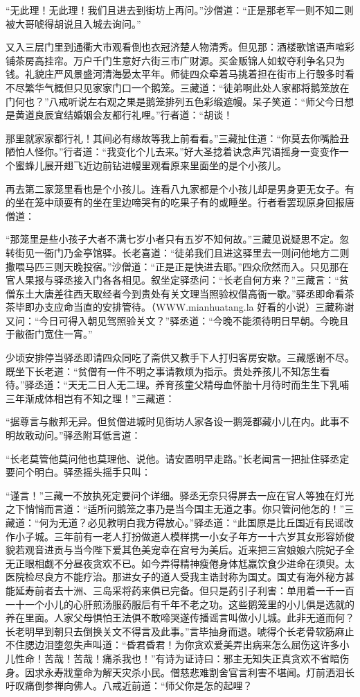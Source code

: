 \documentclass[12pt,UTF8]{ctexbook}
\begin{document}
{	“无此理！无此理！我们且进去到街坊上再问。”沙僧道：“正是那老军一则不知二则被大哥唬得胡说且入城去询问。”
	
	又入三层门里到通衢大市观看倒也衣冠济楚人物清秀。但见那：酒楼歌馆语声喧彩铺茶房高挂帘。万户千门生意好六街三市广财源。买金贩锦人如蚁夺利争名只为钱。礼貌庄严风景盛河清海晏太平年。师徒四众牵着马挑着担在街市上行彀多时看不尽繁华气概但只见家家门口一个鹅笼。三藏道：“徒弟啊此处人家都将鹅笼放在门何也？”八戒听说左右观之果是鹅笼排列五色彩缎遮幔。呆子笑道：“师父今日想是黄道良辰宜结婚姻会友都行礼哩。”行者道：“胡谈！
	
	那里就家家都行礼！其间必有缘故等我上前看看。”三藏扯住道：“你莫去你嘴脸丑陋怕人怪你。”行者道：“我变化个儿去来。”好大圣捻着诀念声咒语摇身一变变作一个蜜蜂儿展开翅飞近边前钻进幔里观看原来里面坐的是个小孩儿。
	
	再去第二家笼里看也是个小孩儿。连看八九家都是个小孩儿却是男身更无女子。有的坐在笼中顽耍有的坐在里边啼哭有的吃果子有的或睡坐。行者看罢现原身回报唐僧道：
	
	“那笼里是些小孩子大者不满七岁小者只有五岁不知何故。”三藏见说疑思不定。忽转街见一衙门乃金亭馆驿。长老喜道：“徒弟我们且进这驿里去一则问他地方二则撒喂马匹三则天晚投宿。”沙僧道：“正是正是快进去耶。”四众欣然而入。只见那在官人果报与驿丞接入门各各相见。叙坐定驿丞问：“长老自何方来？”三藏言：“贫僧东土大唐差往西天取经者今到贵处有关文理当照验权借高衙一歇。”驿丞即命看茶茶毕即办支应命当直的安排管待。（WWW.mianhuatang.la 好看的小说）三藏称谢又问：“今日可得入朝见驾照验关文？”驿丞道：“今晚不能须待明日早朝。今晚且于敝衙门宽住一宵。”
	
	少顷安排停当驿丞即请四众同吃了斋供又教手下人打归客房安歇。三藏感谢不尽。既坐下长老道：“贫僧有一件不明之事请教烦为指示。贵处养孩儿不知怎生看待。”驿丞道：“天无二日人无二理。养育孩童父精母血怀胎十月待时而生生下乳哺三年渐成体相岂有不知之理！”三藏道：
	
	“据尊言与敝邦无异。但贫僧进城时见街坊人家各设一鹅笼都藏小儿在内。此事不明故敢动问。”驿丞附耳低言道：
	
	“长老莫管他莫问他也莫理他、说他。请安置明早走路。”长老闻言一把扯住驿丞定要问个明白。驿丞摇头摇手只叫：
	
	“谨言！”三藏一不放执死定要问个详细。驿丞无奈只得屏去一应在官人等独在灯光之下悄悄而言道：“适所问鹅笼之事乃是当今国主无道之事。你只管问他怎的！”三藏道：“何为无道？必见教明白我方得放心。”驿丞道：“此国原是比丘国近有民谣改作小子城。三年前有一老人打扮做道人模样携一小女子年方一十六岁其女形容娇俊貌若观音进贡与当今陛下爱其色美宠幸在宫号为美后。近来把三宫娘娘六院妃子全无正眼相觑不分昼夜贪欢不已。如今弄得精神瘦倦身体尪羸饮食少进命在须臾。太医院检尽良方不能疗治。那进女子的道人受我主诰封称为国丈。国丈有海外秘方甚能延寿前者去十洲、三岛采将药来俱已完备。但只是药引子利害：单用着一千一百一十一个小儿的心肝煎汤服药服后有千年不老之功。这些鹅笼里的小儿俱是选就的养在里面。人家父母惧怕王法俱不敢啼哭遂传播谣言叫做小儿城。此非无道而何？长老明早到朝只去倒换关文不得言及此事。”言毕抽身而退。唬得个长老骨软筋麻止不住腮边泪堕忽失声叫道：“昏君昏君！为你贪欢爱美弄出病来怎么屈伤这许多小儿性命！苦哉！苦哉！痛杀我也！”有诗为证诗曰：邪主无知失正真贪欢不省暗伤身。因求永寿戕童命为解天灾杀小民。僧慈悲难割舍官言利害不堪闻。灯前洒泪长吁叹痛倒参禅向佛人。八戒近前道：“师父你是怎的起哩？
	
}
\end{document}
